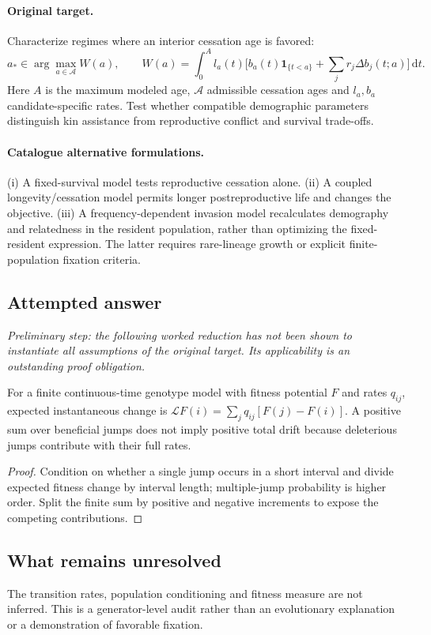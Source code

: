 \documentclass[11pt]{article}
\begin{document}
\paragraph{Original target.}
Characterize regimes where an interior cessation age is favored:
    \[a_*\in\arg\max_{a\in\mathcal A} W(a),\qquad
    W(a)=\int_0^{A}l_a(t)
    \bigl[b_a(t)\mathbf1_{\{t<a\}}+\sum_jr_j\Delta b_j(t;a)\bigr]\,\mathrm{d} t.\]
    Here $A$ is the maximum modeled age, $\mathcal A$ admissible cessation ages and $l_a,b_a$ candidate-specific rates. Test whether compatible demographic parameters distinguish kin assistance from reproductive conflict and survival trade-offs.
\paragraph{Catalogue alternative formulations.}
(i) A fixed-survival model tests reproductive cessation alone. (ii) A coupled longevity/cessation model permits longer postreproductive life and changes the objective. (iii) A frequency-dependent invasion model recalculates demography and relatedness in the resident population, rather than optimizing the fixed-resident expression. The latter requires rare-lineage growth or explicit finite-population fixation criteria.
\subsection{Attempted answer}
\noindent\emph{Preliminary step: the following worked reduction has not been shown to instantiate all assumptions of the original target. Its applicability is an outstanding proof obligation.}

\begin{proposition}
For a finite continuous-time genotype model with fitness potential $F$ and rates $q_{ij}$, expected instantaneous change is $\mathcal LF(i)=\sum_jq_{ij}[F(j)-F(i)]$. A positive sum over beneficial jumps does not imply positive total drift because deleterious jumps contribute with their full rates.
\end{proposition}
\begin{proof}
Condition on whether a single jump occurs in a short interval and divide expected fitness change by interval length; multiple-jump probability is higher order. Split the finite sum by positive and negative increments to expose the competing contributions.
\end{proof}
\subsection{What remains unresolved}
The transition rates, population conditioning and fitness measure are not inferred. This is a generator-level audit rather than an evolutionary explanation or a demonstration of favorable fixation.
\end{document}

